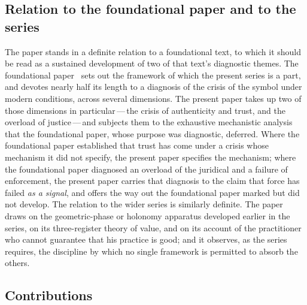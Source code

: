 \subsection*{Relation to the foundational paper and to the series}

The paper stands in a definite relation to a foundational text, to which it should be read as a sustained development of two of that text's diagnostic themes. The foundational paper~\parencite{wanhong_grb} sets out the framework of which the present series is a part, and devotes nearly half its length to a diagnosis of the crisis of the symbol under modern conditions, across several dimensions. The present paper takes up two of those dimensions in particular\,---\,the crisis of authenticity and trust, and the overload of justice\,---\,and subjects them to the exhaustive mechanistic analysis that the foundational paper, whose purpose was diagnostic, deferred. Where the foundational paper established that trust has come under a crisis whose mechanism it did not specify, the present paper specifies the mechanism; where the foundational paper diagnosed an overload of the juridical and a failure of enforcement, the present paper carries that diagnosis to the claim that force has failed \emph{as a signal}, and offers the way out the foundational paper marked but did not develop. The relation to the wider series is similarly definite. The paper draws on the geometric-phase or holonomy apparatus developed earlier in the series, on its three-register theory of value, and on its account of the practitioner who cannot guarantee that his practice is good; and it observes, as the series requires, the discipline by which no single framework is permitted to absorb the others.

\subsection*{Contributions}

